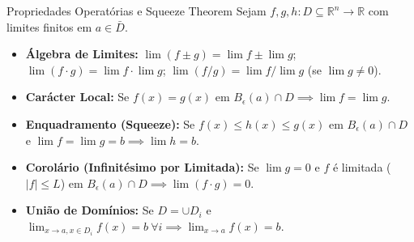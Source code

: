 \documentclass[11pt,a4paper]{article}
\newcommand{\R}{\mathbb{R}}
\begin{document}
\noindent\begin{theorembox}{Propriedades Operatórias e Squeeze Theorem}
  Sejam $f, g, h : D \subseteq \R^n \to \R$ com limites finitos em $a \in \bar{D}$.
  \begin{itemize}
    \item \textbf{Álgebra de Limites:} $\lim(f \pm g) = \lim f \pm \lim g$; $\lim(f \cdot g) = \lim f \cdot \lim g$; $\lim(f/g) = \lim f / \lim g$ (se $\lim g \neq 0$).
    \item \textbf{Carácter Local:} Se $f(x) = g(x)$ em $B_\epsilon(a) \cap D \implies \lim f = \lim g$.
    \item \textbf{Enquadramento (Squeeze):} Se $f(x) \leq h(x) \leq g(x)$ em $B_\epsilon(a) \cap D$ e $\lim f = \lim g = b \implies \lim h = b$.
    \item \textbf{Corolário (Infinitésimo por Limitada):} Se $\lim g = 0$ e $f$ é limitada ($|f| \leq L$) em $B_\epsilon(a) \cap D \implies \lim(f \cdot g) = 0$.
    \item \textbf{União de Domínios:} Se $D = \cup D_i$ e $\lim_{x\to a, x\in D_i} f(x) = b \ \forall i \implies \lim_{x\to a} f(x) = b$.
  \end{itemize}
\end{theorembox}
\end{document}
